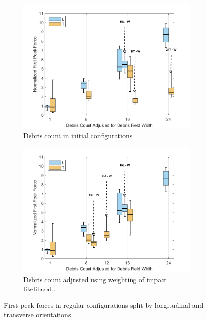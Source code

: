 \documentclass{article}
\begin{document}
\begin{figure}[htbp]
    \centering
    \begin{subfigure}[t]{0.9\textwidth}
        \centering
        \includegraphics[width=\textwidth]{FirstPeak_Regular_SplitByTrial.png}
        \caption{Debris count in initial configurations.}
        \label{fig:firstpeak_regular_original}
    \end{subfigure}
    \hfill
    \begin{subfigure}[t]{0.9\textwidth}
        \centering
        \includegraphics[width=\textwidth]{FirstPeak_Regular_RemappedT.png}
        \caption{Debris count adjusted using weighting of impact likelihood..}
        \label{fig:firstpeak_regular_remap}
    \end{subfigure}
    \caption{First peak forces in regular configurations split by longitudinal and transverse orientations.}
    \label{fig:firstpeak_regular_split}
\end{figure}
\end{document}
